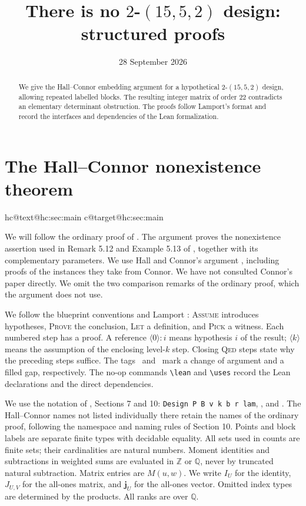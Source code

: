 \documentclass[11pt]{amsart}
\makeatletter
\newcommand\ints{{\mathbb Z}}
\newcommand\rats{{\mathbb Q}}
\newcommand\Zj{{\mathbf j}}
\let\hcSavedLabel\label
\renewcommand{\label}[1]{%
  \hcSavedLabel{#1}%
  \expandafter\protected@xdef\csname hc@text@#1\endcsname{\@currentlabel}%
  \expandafter\xdef\csname hc@target@#1\endcsname{\@currentHref}}
\makeatother
\begin{document}
\title{There is no $2$-$(15,5,2)$ design: structured proofs}
\date{28 September 2026}
\begin{abstract}
We give the Hall--Connor embedding argument for a hypothetical
$2$-$(15,5,2)$ design, allowing repeated labelled blocks. The resulting
integer matrix of order $22$ contradicts an elementary determinant
obstruction. The proofs follow Lamport's format and record the interfaces
and dependencies of the Lean formalization.
\end{abstract}
\maketitle
\tableofcontents
\clearpage

\section{The Hall--Connor nonexistence theorem}\label{hc:sec:main}
\raggedbottom

We will follow the ordinary proof of
. The argument proves the
nonexistence assertion used in Remark 5.12 and Example 5.13 of
\cite{CGSS}, together with its complementary parameters. We use
Hall and Connor's argument \cite{HC}, including proofs of the instances
they take from Connor. We have not consulted Connor's paper directly.
We omit the two comparison remarks of the ordinary proof, which the
argument does not use.

We follow the blueprint conventions and Lamport \cite{L95}:
\textsc{Assume} introduces hypotheses, \textsc{Prove} the conclusion,
\textsc{Let} a definition, and \textsc{Pick} a witness.
Each numbered step has a proof. A reference $\langle0\rangle{:}i$
means hypothesis $i$ of the result; $\langle k\rangle$ means the
assumption of the enclosing level-$k$ step. Closing \textsc{Qed}
steps state why the preceding steps suffice. The tags \new\ and
\repair\ mark a change of argument and a filled gap, respectively.
The no-op commands \verb|\lean| and \verb|\uses| record the Lean
declarations and the direct dependencies.

We use the notation of , Sections 7 and 10:
\texttt{Design P B v k b r lam}, , and .
The Hall--Connor names not listed individually there retain the names
of the ordinary proof, following the namespace and
naming rules of Section 10. Points and block labels are separate finite
types with decidable equality. All sets used in counts are finite sets;
their cardinalities are natural numbers. Moment identities and
subtractions in weighted sums are evaluated in $\ints$ or $\rats$,
never by truncated natural subtraction. Matrix entries are $M(u,w)$.
We write $I_U$ for the identity, $J_{U,V}$ for the all-ones matrix,
and $\Zj_U$ for the all-ones vector. Omitted index types are determined
by the products. All ranks are over $\rats$.
\end{document}
